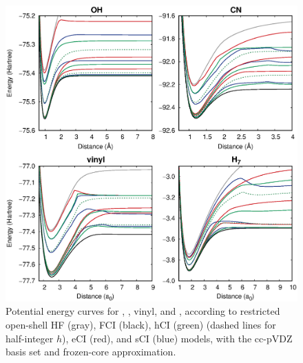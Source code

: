 \documentclass[aip,jcp,preprint,noshowkeys,superscriptaddress]{revtex4-1}
\begin{document}
\begin{figure}%
\includegraphics[width=1.0\linewidth]{plot_pes}
\caption{
Potential energy curves for , , vinyl, and ,
according to restricted open-shell HF (gray), FCI (black), hCI (green) (dashed lines for half-integer $h$), eCI (red), and sCI (blue) models, with the cc-pVDZ basis set and frozen-core approximation.}
\label{fig:plot_pes}
\end{figure}
\end{document}
